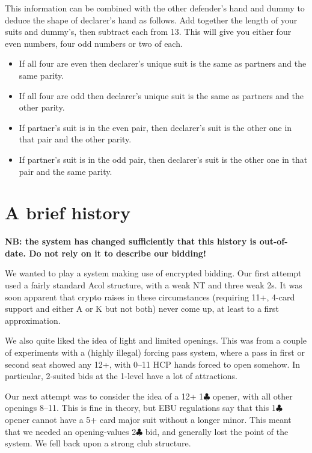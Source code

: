 \documentclass[a4paper,14pt]{extarticle}
\begin{document}
This information can be combined with the other defender's hand and dummy to
deduce the shape of declarer's hand as follows. Add together the length of your
suits and dummy's, then subtract each from 13. This will give you either four
even numbers, four odd numbers or two of each.

\begin{itemize}
\item If all four are even then declarer's unique suit is the same as partners and the same parity.
\item If all four are odd then declarer's unique suit is the same as partners and the other parity.
\item If partner's suit is in the even pair, then declarer's suit is the other one in that pair and the other parity.
\item If partner's suit is in the odd pair, then declarer's suit is the other one in that pair and the same parity.
\end{itemize}

\newpage

\section{A brief history}
\label{sec:history}

{\bf NB: the system has changed sufficiently that this history is out-of-date.  Do
not rely on it to describe our bidding! }

We wanted to play a system making use of encrypted bidding.  Our first attempt
used a fairly standard Acol structure, with a weak NT and three weak 2s.  It
was soon apparent that crypto raises in these circumstances (requiring 11+,
4-card support and either A or K but not both) never come up, at least to a
first approximation.

We also quite liked the idea of light and limited openings.  This was from a
couple of experiments with a (highly illegal) forcing pass system, where a pass
in first or second seat showed any 12+, with 0--11 HCP hands forced to open
somehow.  In particular, 2-suited bids at the 1-level have a lot of
attractions.

Our next attempt was to consider the idea of a 12+ 1$\clubsuit$ opener, with all other
openings 8--11.  This is fine in theory, but EBU regulations say that this 1$\clubsuit$
opener cannot have a 5+ card major suit without a longer minor.  This meant
that we needed an opening-values 2$\clubsuit$ bid, and generally lost the point of the
system.  We fell back upon a strong club structure.
\end{document}
